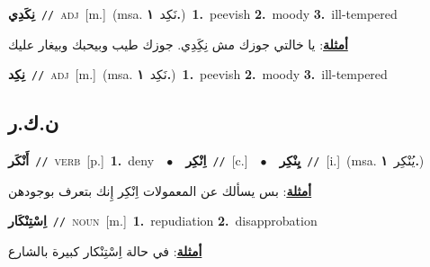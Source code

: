 \documentclass[10pt,a4paper,twoside]{article} %
\begin{document}
\begin{multicols}{2}
{\setlength\topsep{0pt}\textbf{\foreignlanguage{arabic}{نِكَدِي}}\ {\color{gray}\texttt{//}\color{black}}\ \textsc{adj}\ [m.]\ \color{gray}(msa. \foreignlanguage{arabic}{نَكِد}~\foreignlanguage{arabic}{\textbf{١.}})\color{black}\ \textbf{1.}~peevish  \textbf{2.}~moody  \textbf{3.}~ill-tempered\  \begin{flushright}\color{gray}\foreignlanguage{arabic}{\textbf{\underline{\foreignlanguage{arabic}{أمثلة}}}: يا خالتي جوزك مش نِكَِدِي. جوزك طيب وبيحبك وبيغار عليك}\end{flushright}\color{black}} \vspace{2mm}

{\setlength\topsep{0pt}\textbf{\foreignlanguage{arabic}{نِكِد}}\ {\color{gray}\texttt{//}\color{black}}\ \textsc{adj}\ [m.]\ \color{gray}(msa. \foreignlanguage{arabic}{نَكِد}~\foreignlanguage{arabic}{\textbf{١.}})\color{black}\ \textbf{1.}~peevish  \textbf{2.}~moody  \textbf{3.}~ill-tempered\ } \vspace{2mm}

\vspace{-3mm}
\subsection*{\color{blue}\foreignlanguage{arabic}{ن.ك.ر}\color{blue}{}} 

{\setlength\topsep{0pt}\textbf{\foreignlanguage{arabic}{أَنْكَر}}\ {\color{gray}\texttt{//}\color{black}}\ \textsc{verb}\ [p.]\ \textbf{1.}~deny\ \ $\bullet$\ \ \setlength\topsep{0pt}\textbf{\foreignlanguage{arabic}{اِنْكِر}}\ {\color{gray}\texttt{//}\color{black}}\ [c.]\ \ $\bullet$\ \ \setlength\topsep{0pt}\textbf{\foreignlanguage{arabic}{يِنْكِر}}\ {\color{gray}\texttt{//}\color{black}}\ [i.]\ \color{gray}(msa. \foreignlanguage{arabic}{يُنْكِر}~\foreignlanguage{arabic}{\textbf{١.}})\color{black}\  \begin{flushright}\color{gray}\foreignlanguage{arabic}{\textbf{\underline{\foreignlanguage{arabic}{أمثلة}}}: بس يسألك عن المعمولات اِنْكِر إِنك بتعرف بوجودهن}\end{flushright}\color{black}} \vspace{2mm}

{\setlength\topsep{0pt}\textbf{\foreignlanguage{arabic}{اِسْتِنْكَار}}\ {\color{gray}\texttt{//}\color{black}}\ \textsc{noun}\ [m.]\ \textbf{1.}~repudiation  \textbf{2.}~disapprobation\  \begin{flushright}\color{gray}\foreignlanguage{arabic}{\textbf{\underline{\foreignlanguage{arabic}{أمثلة}}}: في حالة اِسْتِنْكار كبيرة بالشارع}\end{flushright}\color{black}} \vspace{2mm}


\end{multicols}
\end{document}
